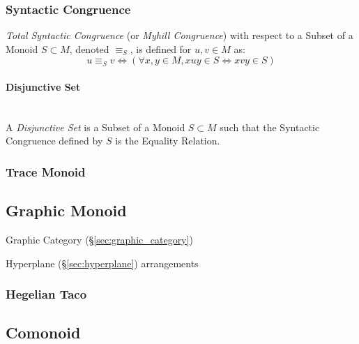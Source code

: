 \subsubsection{Syntactic Congruence}\label{sec:syntactic_congruence}

\emph{Total Syntactic Congruence} (or \emph{Myhill Congruence}) with
respect to a Subset of a Monoid $S \subset M$, denoted $\equiv_S$, is
defined for $u,v \in M$ as:
\[
  u \equiv_S v \Leftrightarrow
  (\forall x,y \in M, xuy \in S \Leftrightarrow xvy \in S)
\]



\paragraph{Disjunctive Set}\label{sec:disjunctive_set}\hfill \\

A \emph{Disjunctive Set} is a Subset of a Monoid $S \subset M$ such
that the Syntactic Congruence defined by $S$ is the Equality Relation.



\subsubsection{Trace Monoid}\label{sec:trace_monoid}



\subsection{Graphic Monoid}\label{sec:graphic_monoid}


Graphic Category (\S\ref{sec:graphic_category})

Hyperplane (\S\ref{sec:hyperplane}) arrangements



\subsubsection{Hegelian Taco}\label{sec:hegelian_taco}



\subsection{Comonoid}\label{sec:comonoid}

